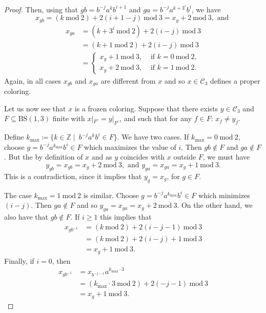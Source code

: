 \documentclass[letterpaper,11pt,reqno]{amsart}
\theoremstyle{plain}
\theoremstyle{definition}
\begin{document}
\begin{proof}
	
	Then, using that $gb=b^{-j}a^kb^{i+1}$ and $ga=b^{-j}a^{k+3^i}b^{i}$, we have 
	\begin{equation*}
	x_{gb}= (k\ \mathrm{mod}\ 2)+2(i+1-j)\ \mathrm{mod}\ 3=x_{g}+2\  \mathrm{mod} \ 3, \text{ and }
	\end{equation*}
	\begin{align*}
	x_{ga}&=(k+3^{i}\ \mathrm{mod} \ 2)+ 2(i-j) \ \mathrm{mod}\ 3 \\
	&=(k+1\ \mathrm{mod} \ 2)+ 2(i-j) \ \mathrm{mod}\ 3\\
	&=\left\{\begin{aligned}
	x_{g}+1 \ \mathrm{mod}\ 3, &\text{ if }k=0\ \mathrm{mod}\ 2, \\
	x_{g}+2 \ \mathrm{mod}\ 3, &\text{ if }k=1\ \mathrm{mod}\ 2.
	\end{aligned} \right.
	\end{align*}
	Again, in all cases $x_{gb}$ and $x_{ga}$ are different from $x$ and so $x\in \mathcal{C}_3$ defines a proper coloring.
	
	Let us now see that $x$ is a frozen coloring. Suppose that there exists $y\in \mathcal{C}_3$ and $F\subseteq \mathrm{BS}(1,3)$ finite with $x|_{F^{c}}=y|_{F^{c}}$, and such that for any $f\in F$: $x_f\neq y_f$.
	
	Define $k_{\mathrm{max}}\coloneqq\{ k\in \mathbb{Z}\mid \ b^{-j}a^kb^i\in F \}$. We have two cases. If $k_\mathrm{max}=0\ \mathrm{mod}\ 2$, choose $g=b^{-j}a^{k_{\mathrm{max}}}b^i\in F$ which maximizes the value of $i$. Then $gb\notin F$ and $ga\notin F$. But the by definition of $x$ and as $y$ coincides with $x$ outside $F$, we must have
	\begin{equation*}
	y_{gb}=x_{gb}=x_{g}+2\ \mathrm{mod}\ 3, \text{ and  } 
	y_{ga}=x_{ga}=x_{g}+1\ \mathrm{mod}\ 3.
	\end{equation*}
	This is a contradiction, since it implies that $y_g=x_g$, for $g\in F$.
	
	
	The case $k_{\mathrm{max}}=1\ \mathrm{mod}\ 2$ is similar. Choose $g=b^{-j}a^{k_\mathrm{max}}b^{i}\in F$ which minimizes $(i-j)$. Then $ga\not \in F$ and so $y_{ga}=x_{ga}=x_{g}+2\ \mathrm{mod}\ 3$. On the other hand, we also have that $gb\not \in F$.
	If $i\ge 1$ this implies that
	\begin{align*}
	x_{gb^{-1}}&=(k\ \mathrm{mod\ 2})+2(i-j-1)\ \mathrm{mod}\ 3\\
	&=(k\ \mathrm{mod\  2})+2(i-j)+1\ \mathrm{mod}\ 3\\
	&=x_g+1\ \mathrm{mod}\ 3.
	\end{align*}
	Finally, if $i=0$, then 
	\begin{align*}
	x_{gb^{-1}}&=x_{b^{-j-1}}a^{k_{\mathrm{max}}\cdot 3}\\
	&=(k_{\mathrm{max}}\cdot 3 \ \mathrm{mod}\ 2)+2(-j-1)\ \mathrm{mod}\ 3\\
	&=x_g+1\ \mathrm{mod}\ 3.
	\end{align*}
	

\end{proof}
\end{document}
